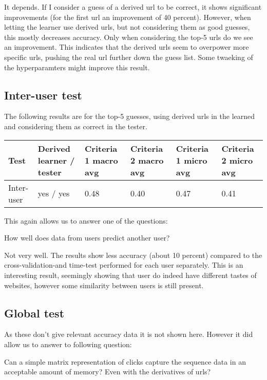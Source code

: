 \documentclass{article}
\begin{document}
It depends.
If I consider a guess of a derived url to be correct, it shows significant improvements (for the first url an improvement of 40 percent).
However, when letting the learner use derived urls, but not considering them as good guesses, this mostly decreases accuracy.
Only when considering the top-5 urls do we see an improvement.
This indicates that the derived urls seem to overpower more specific urls, pushing the real url further down the guess list.
Some twaeking of the hyperparamters might improve this result.

\subsection{Inter-user test}

The following results are for the top-5 guesses, using derived urls in the learned and considering them as correct in the tester.

\begin{tabular}{l | p{1.5cm} || p{1.6cm} | p{1.6cm} | p{1.6cm} | p{1.6cm}}
Test & Derived learner / tester & Criteria 1 macro avg & Criteria 2 macro avg & Criteria 1 micro avg & Criteria 2 micro avg \\ \hline

Inter-user   & yes / yes &  0.48 & 0.40 & 0.47 & 0.41 \\ \hline

\end{tabular}

This again allows us to answer one of the questions:

\begin{displayquote}
How well does data from users predict another user?
\end{displayquote}

Not very well.
The results show less accuracy (about 10 percent) compared to the cross-validation-and time-test performed for each user separately.
This is an interesting result, seemingly showing that user do indeed have different tastes of websites, however some similarity between users is still present.

\subsection{Global test}

As these don't give relevant accuracy data it is not shown here.
However it did allow us to answer to following question:

\begin{displayquote}
Can a simple matrix representation of clicks capture the sequence data in an acceptable amount of memory? Even with the derivatives of urls?
\end{displayquote}
\end{document}
